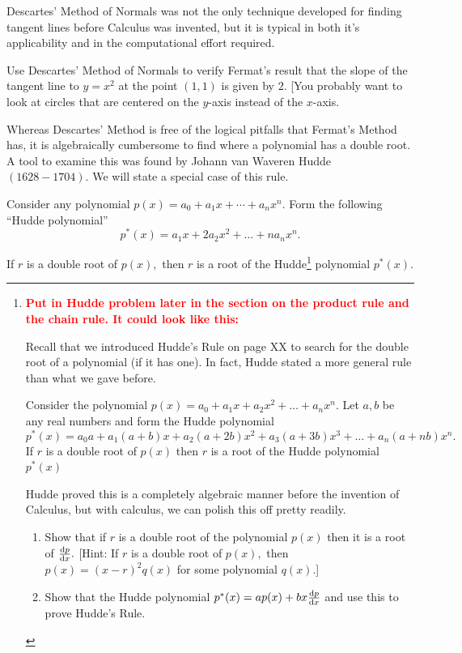  Descartes' Method of Normals was not the only technique developed for
 finding tangent lines before Calculus was invented, but it is
 typical in both it's  applicability and in the computational effort
 required.

 \begin{embeddedproblem}{}
   Use Descartes' Method of Normals to verify Fermat's result that the
   slope of the tangent line to $y=x^2$ at the point $(1,1)$ is given by
   $2.$  [You probably want to look at circles that are centered on the
   $y$-axis instead of the $x$-axis.
 \end{embeddedproblem}

 Whereas Descartes' Method is free of the logical pitfalls that
 Fermat's Method has, it is algebraically cumbersome to find where a
 polynomial has a double root.  A tool to examine this was found by
 Johann van Waveren Hudde $(1628-1704).$  We will state a special case
 of this rule.

 Consider any polynomial $p(x)=a_0+a_1 x+ \cdots +a_n x^n.$ Form the following ``Hudde polynomial'' 
$$
p^* (x)=a_1 x+2a_2 x^2+\ldots+na_n x^n.
$$

If $r$ is a double root of $p(x),$ then $r$ is a root of the
Hudde\footnote{\textcolor{red}{\bf{}Put in Hudde problem later in the section on
    the product rule and the chain rule.  It could look like this:}

	Recall that we introduced Hudde's Rule on page XX to search for the double root of a polynomial (if it has one).  In fact, Hudde stated a more general rule than what we gave before.

  Consider the polynomial $p(x)=a_0+a_1x+a_2x^2+\ldots{}+a_n x^n.$ Let $a,b$ be any real numbers and form the Hudde polynomial 
$$
p^*(x)=a_0 a+a_1 (a+b)x+a_2 (a+2b) x^2+a_3 (a+3b) x^3+\ldots+a_n
(a+nb) x^n.
$$
If $r$ is a double root of $p(x)$ then $r$ is a root of the Hudde
polynomial $p^*(x)$ 

	Hudde proved this is a completely algebraic manner before the invention of Calculus, but with calculus, we can polish this off pretty readily.

        \begin{embeddedproblem}{}
          \begin{enumerate}
          \item Show that if $r$ is a double root of the polynomial
            $p(x)$ 
            then it is a root of $\frac{\text{d}{p}}{\text{d}{x}}.$  [Hint: If $r$ is a double root
            of $p(x),$ then $p(x)=(x-r)^2 q(x)$ for some polynomial
            $q(x).$]
          \item Show that the Hudde polynomial
            $p^*(x)=ap(x)+bx\frac{\text{d}{p}}{\text{d}{x}}$ 
            and use this to prove Hudde's Rule.
          \end{enumerate}
      \end{embeddedproblem}
} polynomial $p^*(x).$

